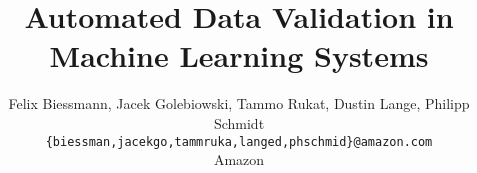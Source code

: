 \documentclass[11pt]{article}
\begin{document}
\title{Automated Data Validation in Machine Learning Systems}
%
\author{Felix Biessmann, Jacek Golebiowski, Tammo Rukat, Dustin Lange, Philipp Schmidt\\
{\small \texttt{\{biessman,jacekgo,tammruka,langed,phschmid\}@amazon.com}}\\
Amazon}

\maketitle








%	
%	
\end{document}
